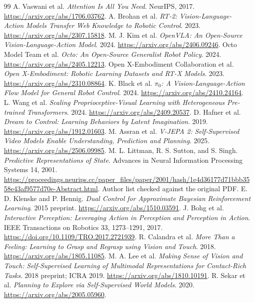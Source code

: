 \documentclass[11pt]{article}
\begin{document}
\begin{thebibliography}{99}
 A. Vaswani et al. \emph{Attention Is All You Need}. NeurIPS, 2017. \url{https://arxiv.org/abs/1706.03762}.
 A. Brohan et al. \emph{RT-2: Vision-Language-Action Models Transfer Web Knowledge to Robotic Control}. 2023. \url{https://arxiv.org/abs/2307.15818}.
 M. J. Kim et al. \emph{OpenVLA: An Open-Source Vision-Language-Action Model}. 2024. \url{https://arxiv.org/abs/2406.09246}.
 Octo Model Team et al. \emph{Octo: An Open-Source Generalist Robot Policy}. 2024. \url{https://arxiv.org/abs/2405.12213}.
 Open X-Embodiment Collaboration et al. \emph{Open X-Embodiment: Robotic Learning Datasets and RT-X Models}. 2023. \url{https://arxiv.org/abs/2310.08864}.
 K. Black et al. \emph{$\pi_0$: A Vision-Language-Action Flow Model for General Robot Control}. 2024. \url{https://arxiv.org/abs/2410.24164}.
 L. Wang et al. \emph{Scaling Proprioceptive-Visual Learning with Heterogeneous Pre-trained Transformers}. 2024. \url{https://arxiv.org/abs/2409.20537}.
 D. Hafner et al. \emph{Dream to Control: Learning Behaviors by Latent Imagination}. 2019. \url{https://arxiv.org/abs/1912.01603}.
 M. Assran et al. \emph{V-JEPA 2: Self-Supervised Video Models Enable Understanding, Prediction and Planning}. 2025. \url{https://arxiv.org/abs/2506.09985}.
 M. L. Littman, R. S. Sutton, and S. Singh. \emph{Predictive Representations of State}. Advances in Neural Information Processing Systems 14, 2001. \url{https://proceedings.neurips.cc/paper_files/paper/2001/hash/1e4d36177d71bbb3558e43af9577d70e-Abstract.html}. Author list checked against the original PDF.
 E. D. Klenske and P. Hennig. \emph{Dual Control for Approximate Bayesian Reinforcement Learning}. 2015 preprint. \url{https://arxiv.org/abs/1510.03591}.
 J. Bohg et al. \emph{Interactive Perception: Leveraging Action in Perception and Perception in Action}. IEEE Transactions on Robotics 33, 1273--1291, 2017. \url{https://doi.org/10.1109/TRO.2017.2721939}.
 R. Calandra et al. \emph{More Than a Feeling: Learning to Grasp and Regrasp using Vision and Touch}. 2018. \url{https://arxiv.org/abs/1805.11085}.
 M. A. Lee et al. \emph{Making Sense of Vision and Touch: Self-Supervised Learning of Multimodal Representations for Contact-Rich Tasks}. 2018 preprint; ICRA 2019. \url{https://arxiv.org/abs/1810.10191}.
 R. Sekar et al. \emph{Planning to Explore via Self-Supervised World Models}. 2020. \url{https://arxiv.org/abs/2005.05960}.

\end{thebibliography}
\end{document}
